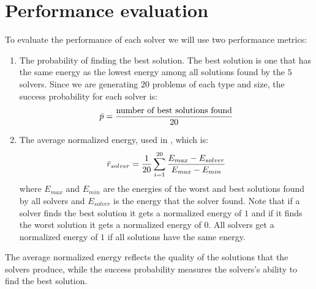 
\section{Performance evaluation}
To evaluate the performance of each solver we will use two performance metrics:
\begin{enumerate}
    \item The probability of finding the best solution. The best solution is one that has the same energy as the lowest energy among all solutions found by the $5$ solvers. Since we are generating $20$ problems of each type and size, the success probability for each solver is:
    \begin{equation}
        \Bar{p} = \frac{\text{number of best solutions found}}{20}
    \end{equation}
    \item The average normalized energy, used in \cite{b34}, which is:
    \begin{equation}
        \Bar{r}_{solver} =  \frac{1}{20} \sum_{i = 1}^{20} \frac{E_{max} - E_{solver}}{E_{max} - E_{min}}
    \end{equation}
    where $E_{max}$ and $E_{min}$ are the energies of the worst and best solutions found by all solvers and $E_{solver}$ is the energy that the solver found. Note that if a solver finds the best solution it gets a normalized energy of $1$ and if it finds the worst solution it gets a normalized energy of $0$. All solvers get a normalized energy of $1$ if all solutions have the same energy.
\end{enumerate}

The average normalized energy reflects the quality of the solutions that the solvers produce, while the success probability measures the solvers's ability to find the best solution.